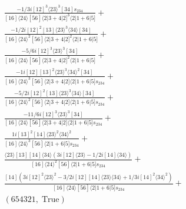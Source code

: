\documentclass[varwidth, border=5pt]{standalone}
\begin{document}
\begin{my}
$\begin{gathered}
\scriptscriptstyle\frac{-1/3i[12]^3⟨23⟩^3[34]s_{234}}{[16]⟨24⟩[56]⟨2|3+4|2]^3⟨2|1+6|5]}+\\
\scriptscriptstyle\frac{-1/2i[12]^2[13]⟨23⟩^3⟨34⟩[34]}{[16]⟨24⟩^2[56]⟨2|3+4|2]^2⟨2|1+6|5]}+\\
\scriptscriptstyle\frac{-5/6i[12]^3⟨23⟩^3[34]}{[16]⟨24⟩[56]⟨2|3+4|2]^2⟨2|1+6|5]}+\\
\scriptscriptstyle\frac{-1i[12][13]^2⟨23⟩^3⟨34⟩^2[34]}{[16]⟨24⟩^3[56]⟨2|3+4|2]⟨2|1+6|5]s_{234}}+\\
\scriptscriptstyle\frac{-5/2i[12]^2[13]⟨23⟩^3⟨34⟩[34]}{[16]⟨24⟩^2[56]⟨2|3+4|2]⟨2|1+6|5]s_{234}}+\\
\scriptscriptstyle\frac{-11/6i[12]^3⟨23⟩^3[34]}{[16]⟨24⟩[56]⟨2|3+4|2]⟨2|1+6|5]s_{234}}+\\
\scriptscriptstyle\frac{1i[13]^2[14]⟨23⟩^2⟨34⟩^2}{[16]⟨24⟩^3[56]⟨2|1+6|5]s_{234}}+\\
\scriptscriptstyle\frac{⟨23⟩[13][14]⟨34⟩(3i[12]⟨23⟩-1/2i[14]⟨34⟩)}{[16]⟨24⟩^2[56]⟨2|1+6|5]s_{234}}+\\
\scriptscriptstyle\frac{[14](3i[12]^2⟨23⟩^2-3/2i[12][14]⟨23⟩⟨34⟩+1/3i[14]^2⟨34⟩^2)}{[16]⟨24⟩[56]⟨2|1+6|5]s_{234}}+\\
\scriptscriptstyle(654321,\;\text{True})\phantom{+}
\end{gathered}$
\end{my}
\end{document}
